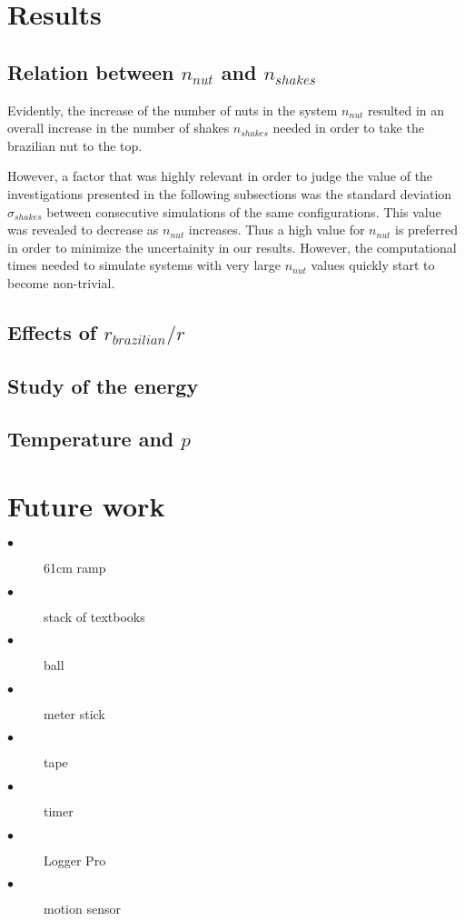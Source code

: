 \documentclass[12pt]{article}
\begin{document}
\section{Results}

\subsection{Relation between $n_{nut}$ and $n_{shakes}$}
Evidently, the increase of the number of nuts in the system $n_{nut}$ resulted in an overall increase in the number of shakes $n_{shakes}$ needed in order to take the brazilian nut to the top.

However, a factor that was highly relevant in order to judge the value of the investigations presented in the following subsections was the standard deviation $\sigma_{shakes}$ between consecutive simulations of the same configurations. This value was revealed to decrease as $n_{nut}$ increases. Thus a high value for $n_{nut}$ is preferred in order to minimize the uncertainity in our results. However, the computational times needed to simulate systems with very large $n_{nut}$ values quickly start to become non-trivial. 

\subsection{Effects of $r_{brazilian}/r$}

\subsection{Study of the energy}

\subsection{Temperature and $p$}

\section{Future work} %

\begin{description}
  \item[$\bullet$] 61cm ramp
  \item[$\bullet$] stack of textbooks
  \item[$\bullet$] ball
  \item[$\bullet$] meter stick
  \item[$\bullet$] tape
  \item[$\bullet$] timer
  \item[$\bullet$] Logger Pro
  \item[$\bullet$] motion sensor
\end{description}
\end{document}
